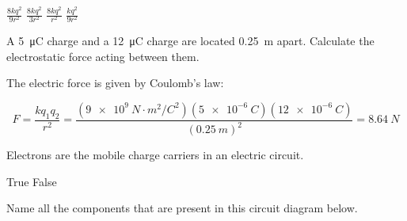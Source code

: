 \documentclass[answers]{exam}
\begin{document}
\begin{questions}
\begin{randomizeoneparchoices}
    \correctchoice $\displaystyle \frac{8kq^2}{9r^2}$
    \choice $\displaystyle \frac{8kq^2}{3r^2}$
    \choice $\displaystyle \frac{8kq^2}{r^2}$
    \choice $\displaystyle \frac{kq^2}{9r^2}$
\end{randomizeoneparchoices}

\question
A \SI{5}{\micro\coulomb} charge and a \SI{12}{\micro\coulomb} charge are located \SI{0.25}{m} apart. Calculate the electrostatic force acting between them.

\begin{solutionorbox}[4cm]
The electric force is given by Coulomb's law:

\begin{equation*}
    F = \frac{kq_1q_2}{r^2} = \frac{\left(\SI{9e9}{N\cdot m^2/C^2}\right)(\SI{5e-6}{C})(\SI{12e-6}{C})}{(\SI{0.25}{m})^2} = \SI{8.64}{N}
\end{equation*}
\end{solutionorbox}


\clearpage


\question
Electrons are the mobile charge carriers in an electric circuit.

\begin{randomizechoices}[norandomize]
    \correctchoice True
    \choice False
\end{randomizechoices}

\question
Name all the components that are present in this circuit diagram below.
\bigskip


\begin{center}
\end{center}



\end{questions}
\end{document}
